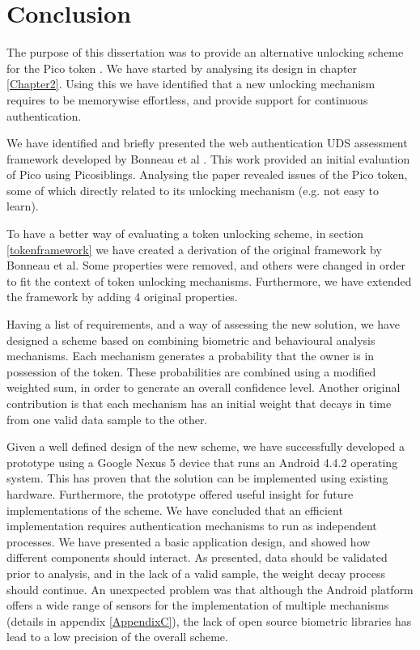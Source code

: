 
\chapter{Conclusion} %

\label{Chapter7} %


The purpose of this dissertation was to provide an alternative unlocking scheme for the Pico token \cite{stajano2011pico}. We have started by analysing its design in chapter \ref{Chapter2}. Using this we have identified that a new unlocking mechanism requires to be memorywise effortless, and provide support for continuous authentication.

We have identified and briefly presented the web authentication UDS assessment framework developed by Bonneau et al \cite{bonneau2012quest}. This work provided an initial evaluation of Pico using Picosiblings. Analysing the paper revealed issues of the Pico token, some of which directly related to its unlocking mechanism (e.g. not easy to learn).

To have a better way of evaluating a token unlocking scheme, in section \ref{tokenframework} we have created a derivation of the original framework by Bonneau et al. Some properties were removed, and others were changed in order to fit the context of token unlocking mechanisms. Furthermore, we have extended the framework by adding 4 original properties.

Having a list of requirements, and a way of assessing the new solution, we have designed a scheme based on combining biometric and behavioural analysis mechanisms. Each mechanism generates a probability that the owner is in possession of the token. These probabilities are combined using a modified weighted sum, in order to generate an overall confidence level. Another original contribution is that each mechanism has an initial weight that decays in time from one valid data sample to the other. 

Given a well defined design of the new scheme, we have successfully developed a prototype using a Google Nexus 5 device that runs an Android 4.4.2 operating system. This has proven that the solution can be implemented using existing hardware. Furthermore, the prototype offered useful insight for future implementations of the scheme. We have concluded that an efficient implementation requires authentication mechanisms to run as independent processes. We have presented a basic application design, and showed how different components should interact. As presented, data should be validated prior to analysis, and in the lack of a valid sample, the weight decay process should continue. An unexpected problem was that although the Android platform offers a wide range of sensors for the implementation of multiple mechanisms (details in appendix \ref{AppendixC}), the lack of open source biometric libraries has lead to a low precision of the overall scheme.

